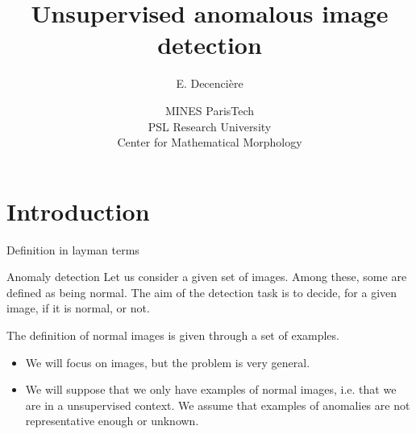 \documentclass[xcolor=pdftex,dvipsnames,table,mathserif]{beamer}
\title{Unsupervised anomalous image detection}
\author{E. Decencière}
\date{MINES ParisTech\\
  PSL Research University\\
  Center for Mathematical Morphology
}
\begin{document}
\frame{\titlepage}


\section{Introduction}

\begin{frame}{Definition in layman terms}


  \begin{block}{Anomaly detection}
    Let us consider a given set of images. Among these, some  are defined as being \alert{normal}. The aim of the detection task is to decide, for a given image, if it is normal, or not.

    The definition of normal images is given through a set of examples.
  \end{block}

  \begin{itemize}
  \item We will focus on images, but the problem is very general.
  \item We will suppose that we only have examples of normal images, i.e. that we are in a \alert{unsupervised} context. We assume that examples of anomalies are not representative enough or unknown.
  \end{itemize}



\end{frame}
\end{document}

